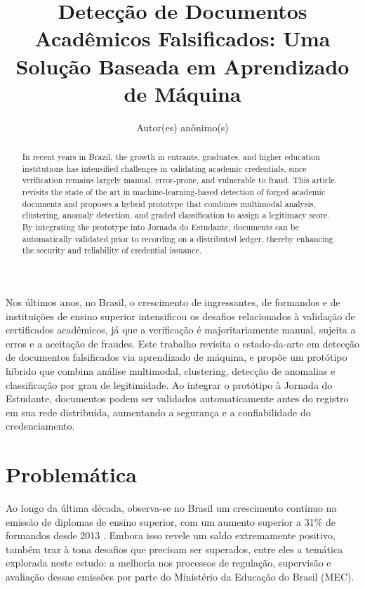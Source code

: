 \documentclass[12pt]{article}
\title{Detecção de Documentos Acadêmicos Falsificados: Uma Solução Baseada em Aprendizado de Máquina}
\author{Autor(es) anônimo(s)\inst{1} }
\begin{document}
 

\maketitle

\begin{abstract}
  In recent years in Brazil, the growth in entrants, graduates, and higher education institutions has intensified challenges in validating academic credentials, since verification remains largely manual, error-prone, and vulnerable to fraud. 
  This article revisits the state of the art in machine-learning-based detection of forged academic documents and proposes a hybrid prototype that combines multimodal analysis, clustering, anomaly detection, and graded classification to assign a legitimacy score. 
  By integrating the prototype into Jornada do Estudante, documents can be automatically validated prior to recording on a distributed ledger, thereby enhancing the security and reliability of credential issuance.
\end{abstract}
     
\begin{resumo} 
  Nos últimos anos, no Brasil, o crescimento de ingressantes, de formandos e de instituições de ensino superior intensificou os desafios relacionados à validação de certificados acadêmicos, já que a verificação é majoritariamente manual, sujeita a erros e a aceitação de fraudes.
  Este trabalho revisita o estado-da-arte em detecção de documentos falsificados via aprendizado de máquina, e propõe um protótipo híbrido que combina análise multimodal, clustering, detecção de anomalias e classificação por grau de legitimidade.
  Ao integrar o protótipo à Jornada do Estudante, documentos podem ser validados automaticamente antes do registro em sua rede distribuída, aumentando a segurança e a confiabilidade do credenciamento.
\end{resumo}


\section{Problemática}

Ao longo da última década, observa-se no Brasil um crescimento contínuo na emissão de diplomas de ensino superior, com um aumento superior a 31\% de formandos desde 2013 \cite{inep:2023}. Embora isso revele um saldo extremamente positivo, também traz à tona desafios que precisam ser superados, entre eles a temática explorada neste estudo: a melhoria nos processos de regulação, supervisão e avaliação dessas emissões por parte do Ministério da Educação do Brasil (MEC).
\end{document}
